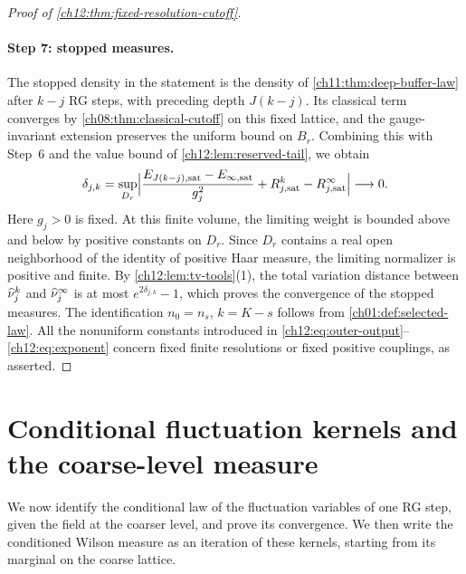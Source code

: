 \begin{proof}[Proof of \cref{ch12:thm:fixed-resolution-cutoff}]
\paragraph{Step 7: stopped measures.}
The stopped density in the statement is the density of \cref{ch11:thm:deep-buffer-law} after $k-j$ RG steps, with preceding depth $J(k-j)$. Its classical term converges by \cref{ch08:thm:classical-cutoff} on this fixed lattice, and the gauge-invariant extension preserves the uniform bound on $B_r$. Combining this with Step~6 and the value bound of \cref{ch12:lem:reserved-tail}, we obtain
\begin{equation}
 \delta_{j,k}=\sup_{D_r}\Bigl\lvert\frac{E_{J(k-j),\mathrm{sat}}-E_{\infty,\mathrm{sat}}}{g_j^2}+R_{j,\mathrm{sat}}^k-R_{j,\mathrm{sat}}^\infty\Bigr\rvert\longrightarrow0. \label{ch12:eq:exponent}
\end{equation}
Here $g_j>0$ is fixed. At this finite volume, the limiting weight is bounded above and below by positive constants on $D_r$. Since $D_r$ contains a real open neighborhood of the identity of positive Haar measure, the limiting normalizer is positive and finite. By \cref{ch12:lem:tv-tools}(1), the total variation distance between $\widehat\nu_j^k$ and $\widehat\nu_j^\infty$ is at most $e^{2\delta_{j,k}}-1$, which proves the convergence of the stopped measures. The identification $n_0=n_s$, $k=K-s$ follows from \cref{ch01:def:selected-law}. All the nonuniform constants introduced in \eqref{ch12:eq:outer-output}--\eqref{ch12:eq:exponent} concern fixed finite resolutions or fixed positive couplings, as asserted.
\end{proof}

\section{Conditional fluctuation kernels and the coarse-level measure}\label{ch12:sec:kernels}

We now identify the conditional law of the fluctuation variables of one RG step, given the field at the coarser level, and prove its convergence. We then write the conditioned Wilson measure as an iteration of these kernels, starting from its marginal on the coarse lattice.

